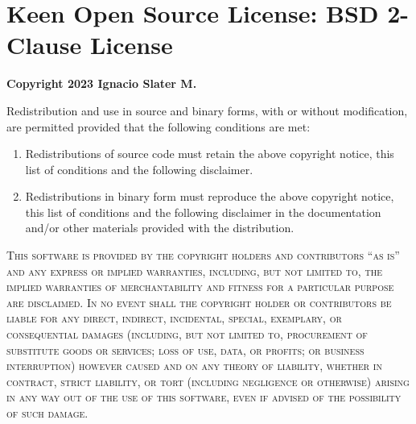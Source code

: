 \chapter{Keen Open Source License: BSD 2-Clause License}

\textbf{Copyright 2023 Ignacio Slater M.}

Redistribution and use in source and binary forms, with or without 
modification, are permitted provided that the following conditions are met:

\begin{enumerate}
  \item Redistributions of source code must retain the above copyright 
    notice, this list of conditions and the following disclaimer.
  \item Redistributions in binary form must reproduce the above copyright
    notice, this list of conditions and the following disclaimer in the
    documentation and/or other materials provided with the distribution.
\end{enumerate}

\textsc{This software is provided by the copyright holders and contributors \enquote{as 
is} and any express or implied warranties, including, but not limited to, the 
implied warranties of merchantability and fitness for a particular purpose are 
disclaimed. In no event shall the copyright holder or contributors be liable 
for any direct, indirect, incidental, special, exemplary, or consequential 
damages (including, but not limited to, procurement of substitute goods or 
services; loss of use, data, or profits; or business interruption) however 
caused and on any theory of liability, whether in contract, strict liability, 
or tort (including negligence or otherwise) arising in any way out of the use 
of this software, even if advised of the possibility of such damage.}